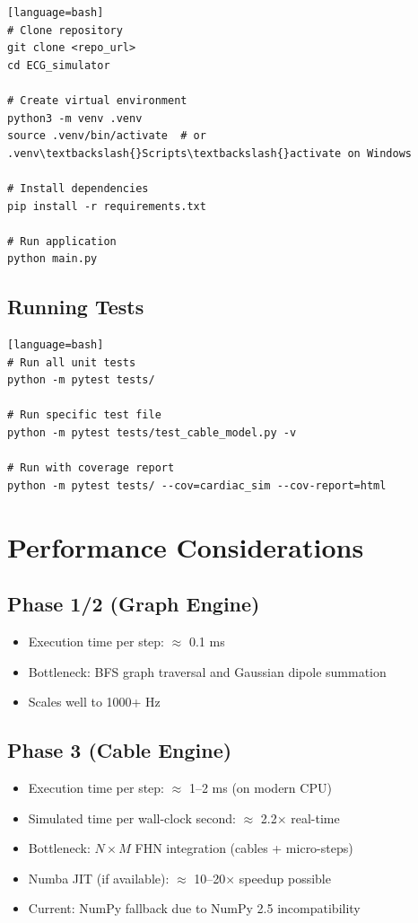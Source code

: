 \documentclass[12pt,a4paper,oneside]{book}
\begin{document}
\begin{Verbatim}[formatcom=\color{black}][language=bash]
# Clone repository
git clone <repo_url>
cd ECG_simulator

# Create virtual environment
python3 -m venv .venv
source .venv/bin/activate  # or .venv\textbackslash{}Scripts\textbackslash{}activate on Windows

# Install dependencies
pip install -r requirements.txt

# Run application
python main.py
\end{Verbatim}

\subsection{Running Tests}

\begin{Verbatim}[formatcom=\color{black}][language=bash]
# Run all unit tests
python -m pytest tests/

# Run specific test file
python -m pytest tests/test_cable_model.py -v

# Run with coverage report
python -m pytest tests/ --cov=cardiac_sim --cov-report=html
\end{Verbatim}

\section{Performance Considerations}

\subsection{Phase 1/2 (Graph Engine)}

\begin{itemize}
    \item Execution time per step: $\approx$ 0.1 ms
    \item Bottleneck: BFS graph traversal and Gaussian dipole summation
    \item Scales well to 1000+ Hz
\end{itemize}

\subsection{Phase 3 (Cable Engine)}

\begin{itemize}
    \item Execution time per step: $\approx$ 1--2 ms (on modern CPU)
    \item Simulated time per wall-clock second: $\approx$ 2.2$\times$ real-time
    \item Bottleneck: $N \times M$ FHN integration (cables + micro-steps)
    \item Numba JIT (if available): $\approx$ 10--20$\times$ speedup possible
    \item Current: NumPy fallback due to NumPy 2.5 incompatibility
\end{itemize}
\end{document}
